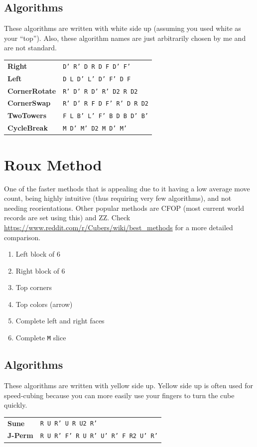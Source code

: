 \documentclass[10pt,landscape]{cheatsheet}
\newcommand{\mitem}[2]{\textbf{#1} & \texttt{#2} \\}
\begin{document}
\begin{multicols}{3}
\subsection{Algorithms}

These algorithms are written with white side up (assuming you used white as your ``top'').
Also, these algorithm names are just arbitrarily chosen by me and are not standard.

\begin{tabular}{ll}
    \toprule
    \mitem{Right}{D' R' D R D F D' F'}
    \mitem{Left}{D L D' L' D' F' D F}
    \midrule
    \mitem{CornerRotate}{R' D' R D' R' D2 R D2}
    \mitem{CornerSwap}{R' D' R F D F' R' D R D2}
    \mitem{TwoTowers}{F L B' L' F' B D B D' B'}
    \mitem{CycleBreak}{M D' M' D2 M D' M'}
    \bottomrule
\end{tabular}

\vfill

\section{Roux Method}

One of the faster methods that is appealing due to it having a low average move count, being highly intuitive (thus requiring very few algorithms), and not needing reorientations.
Other popular methods are CFOP (most current world records are set using this) and ZZ.
Check \url{https://www.reddit.com/r/Cubers/wiki/best_methods} for a more detailed comparison.

\begin{enumerate}
    \item Left block of 6
    \item Right block of 6
    \item Top corners
    \item Top colors (arrow)
    \item Complete left and right faces
    \item Complete \texttt{M} slice
\end{enumerate}

\subsection{Algorithms}

These algorithms are written with yellow side up.
Yellow side up is often used for speed-cubing because you can more easily use your fingers to turn the cube quickly.

\begin{tabular}{ll}
    \toprule
    \mitem{Sune}{R U R' U R U2 R'}
    \mitem{J-Perm}{R U R' F' R U R' U' R' F R2 U' R'}
    \bottomrule
\end{tabular}

\end{multicols}
\end{document}
